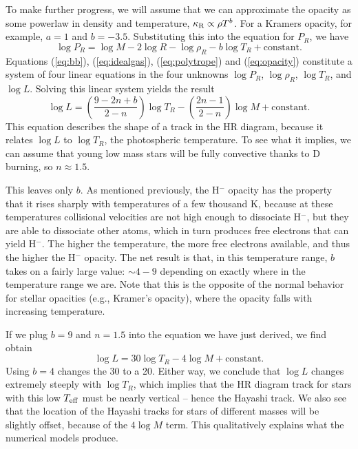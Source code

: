 To make further progress, we will assume that we can approximate the opacity as some powerlaw in density and temperature, $\kappa_{\rm R} \propto \rho T^b$. For a Kramers opacity, for example, $a=1$ and $b=-3.5$. Substituting this into the equation for $P_R$, we have
\begin{equation}
\label{eq:opacity}
\log P_R = \log M - 2\log R - \log \rho_R - b\log T_R + \mbox{constant}.
\end{equation}
Equations (\ref{eq:bb}), (\ref{eq:idealgas}), (\ref{eq:polytrope}) and (\ref{eq:opacity}) constitute a system of four linear equations in the four unknowns $\log P_R$, $\log \rho_R$, $\log T_R$, and $\log L$. Solving this linear system yields the result
\begin{equation}
\log L = \left(\frac{9 - 2 n + b}{2-n}\right) \log T_R - \left(\frac{2n-1}{2-n}\right) \log M + \mbox{constant}.
\end{equation}
This equation describes the shape of a track in the HR diagram, because it relates $\log L$ to $\log T_R$, the photospheric temperature. To see what it implies, we can assume that young low mass stars will be fully convective thanks to D burning, so $n\approx 1.5$.

This leaves only $b$. As mentioned previously, the H$^{-}$ opacity has the property that it rises sharply with temperatures of a few thousand K, because at these temperatures collisional velocities are not high enough to dissociate H$^-$, but they are able to dissociate other atoms, which in turn produces free electrons that can yield H$^{-}$. The higher the temperature, the more free electrons available, and thus the higher the H$^{-}$ opacity. The net result is that, in this temperature range, $b$ takes on a fairly large value: $\sim 4-9$ depending on exactly where in the temperature range we are. Note that this is the opposite of the normal behavior for stellar opacities (e.g., Kramer's opacity), where the opacity falls with increasing temperature.

If we plug $b = 9$ and $n=1.5$ into the equation we have just derived, we find obtain
\begin{equation}
\log L = 30\log T_R - 4 \log M + \mbox{constant}.
\end{equation}
Using $b=4$ changes the 30 to a 20. Either way, we conclude that $\log L$ changes extremely steeply with $\log T_R$, which implies that the HR diagram track for stars with this low $T_{\rm eff}$ must be nearly vertical -- hence the Hayashi track. We also see that the location of the Hayashi tracks for stars of different masses will be slightly offset, because of the $4\log M$ term. This qualitatively explains what the numerical models produce.

